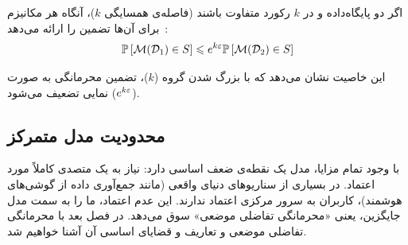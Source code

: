 \begin{قضیه}
\label{thm:group-privacy}
اگر دو پایگاه‌داده \Dset[1] و \Dset[2] در $k$ رکورد متفاوت باشند (فاصله‌ی همسایگی $k$)، آنگاه هر مکانیزم \DP\ برای آن‌ها تضمین \DP[(k\eps)] را ارائه می‌دهد:
\begin{equation}
\mathbb{P}\left[\mech(\Dset[1]) \in S\right] \le e^{k\eps} \mathbb{P}\left[\mech(\Dset[2]) \in S\right]
\end{equation}
\end{قضیه}
این خاصیت نشان می‌دهد که با بزرگ شدن گروه ($k$)، تضمین محرمانگی به صورت نمایی تضعیف می‌شود ($e^{k\varepsilon}$).

\subsection{محدودیت مدل متمرکز}
\label{sec:bg:cdp-limitations}

با وجود تمام مزایا، مدل  یک نقطه‌ی ضعف اساسی دارد: نیاز به یک متصدی کاملاً مورد اعتماد. در بسیاری از سناریوهای دنیای واقعی (مانند جمع‌آوری داده از گوشی‌های هوشمند)، کاربران به سرور مرکزی اعتماد ندارند. این عدم اعتماد، ما را به سمت مدل جایگزین، یعنی «محرمانگی تفاضلی موضعی» سوق می‌دهد. در فصل بعد با محرمانگی تفاضلی موضعی و تعاریف و قضایای اساسی آن آشنا خواهیم شد.